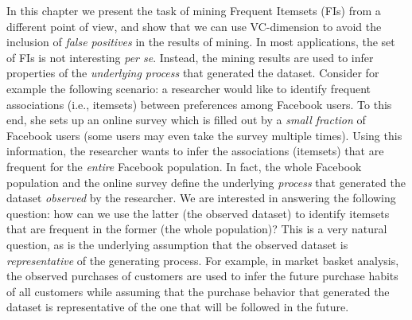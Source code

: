 
In this chapter we present the task of mining Frequent Itemsets (FIs) from a
different point of view, and show that we can use VC-dimension to avoid the
inclusion of \emph{false positives} in the results of mining. In most
applications, the set of FIs is not interesting \emph{per
se}. %
Instead, the mining results %
are used to infer properties of the \emph{underlying process} that generated the
dataset. Consider for example the following scenario: a researcher would like %
to identify frequent associations (i.e., itemsets) between preferences among
Facebook users. To this end, she sets up an online survey %
which is filled out by a \emph{small fraction} of Facebook users (some users may even
take the survey multiple times). Using this information, the researcher wants to
infer the associations (itemsets) that are frequent for the \emph{entire} Facebook
population. In fact, the %
 whole Facebook population and the online survey define the underlying \emph{process} that
generated the dataset \emph{observed} by the researcher. We are
interested in answering the following question: %
how can we use the latter (the observed dataset) to identify itemsets that are
frequent in the former (the whole population)?
This is a very natural question, as is the underlying assumption that the
observed dataset is \emph{representative} of the generating process. For
example, in market basket analysis, 
the observed purchases of customers are used to infer the future
purchase habits %
of all customers while assuming that %
the purchase behavior that generated the dataset is representative of the one
that will be followed in the future.

